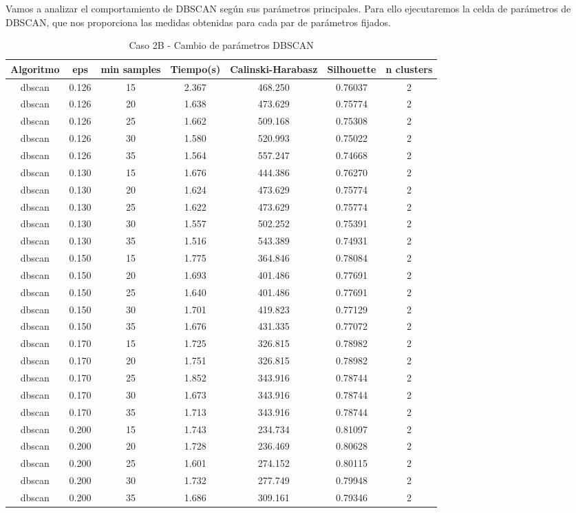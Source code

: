 Vamos a analizar el comportamiento de DBSCAN según sus parámetros principales. Para ello ejecutaremos la celda de parámetros de DBSCAN, que nos proporciona las medidas obtenidas para cada par de parámetros fijados.

\begin{table}[H]
\centering
\caption{Caso 2B - Cambio de parámetros DBSCAN}
\label{tab:c2B_dbscan}
\begin{tabular}{ccccccc}
\toprule
Algoritmo & eps & min samples & Tiempo(s) & Calinski-Harabasz & Silhouette & n clusters \\
\midrule
dbscan & 0.126 & 15 & 2.367 & 468.250 & 0.76037 & 2 \\
dbscan & 0.126 & 20 & 1.638 & 473.629 & 0.75774 & 2 \\
dbscan & 0.126 & 25 & 1.662 & 509.168 & 0.75308 & 2 \\
dbscan & 0.126 & 30 & 1.580 & 520.993 & 0.75022 & 2 \\
dbscan & 0.126 & 35 & 1.564 & 557.247 & 0.74668 & 2 \\
dbscan & 0.130 & 15 & 1.676 & 444.386 & 0.76270 & 2 \\
dbscan & 0.130 & 20 & 1.624 & 473.629 & 0.75774 & 2 \\
dbscan & 0.130 & 25 & 1.622 & 473.629 & 0.75774 & 2 \\
dbscan & 0.130 & 30 & 1.557 & 502.252 & 0.75391 & 2 \\
dbscan & 0.130 & 35 & 1.516 & 543.389 & 0.74931 & 2 \\
dbscan & 0.150 & 15 & 1.775 & 364.846 & 0.78084 & 2 \\
dbscan & 0.150 & 20 & 1.693 & 401.486 & 0.77691 & 2 \\
dbscan & 0.150 & 25 & 1.640 & 401.486 & 0.77691 & 2 \\
dbscan & 0.150 & 30 & 1.701 & 419.823 & 0.77129 & 2 \\
dbscan & 0.150 & 35 & 1.676 & 431.335 & 0.77072 & 2 \\
dbscan & 0.170 & 15 & 1.725 & 326.815 & 0.78982 & 2 \\
dbscan & 0.170 & 20 & 1.751 & 326.815 & 0.78982 & 2 \\
dbscan & 0.170 & 25 & 1.852 & 343.916 & 0.78744 & 2 \\
dbscan & 0.170 & 30 & 1.673 & 343.916 & 0.78744 & 2 \\
dbscan & 0.170 & 35 & 1.713 & 343.916 & 0.78744 & 2 \\
dbscan & 0.200 & 15 & 1.743 & 234.734 & 0.81097 & 2 \\
dbscan & 0.200 & 20 & 1.728 & 236.469 & 0.80628 & 2 \\
dbscan & 0.200 & 25 & 1.601 & 274.152 & 0.80115 & 2 \\
dbscan & 0.200 & 30 & 1.732 & 277.749 & 0.79948 & 2 \\
dbscan & 0.200 & 35 & 1.686 & 309.161 & 0.79346 & 2 \\
\bottomrule
\end{tabular}
\end{table}

